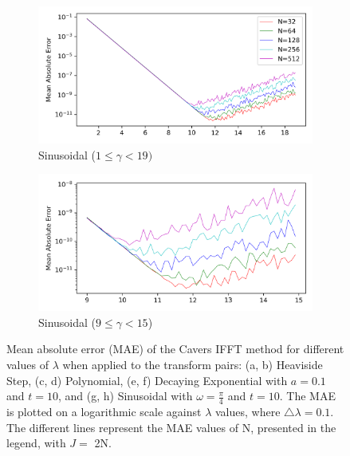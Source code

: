 \documentclass[a4paper]{report}
\begin{document}
\begin{figure}[H]\ContinuedFloat
    
    \begin{subfigure}{.45\linewidth}
      \includegraphics[width=\linewidth]{images/cavers/sinusoidal_2N.png}
      \caption{Sinusoidal ($1 \leq \gamma < 19)$}
    \end{subfigure}\hfill
    \begin{subfigure}{.45\linewidth}
      \includegraphics[width=\linewidth]{images/cavers/sinusoidal_zoomed_2N.png}
      \caption{Sinusoidal ($9 \leq \gamma < 15$)}
    \end{subfigure}
    
    \caption{Mean absolute error (MAE) of the Cavers IFFT method for different values of $\lambda$ when applied to the transform pairs: (a, b) Heaviside Step, (c, d) Polynomial, (e, f) Decaying Exponential with $a = 0.1$ and $t = 10$, and (g, h) Sinusoidal with $\omega = \frac{\pi}{4}$ and $t = 10$. The MAE is plotted on a logarithmic scale against $\lambda$ values, where $\triangle \lambda = 0.1$. The different lines represent the MAE values of N, presented in the legend, with $J =$ 2N.}
    \label{fig:MAE_Cavers_IFFT_2N}
\end{figure}
\end{document}
